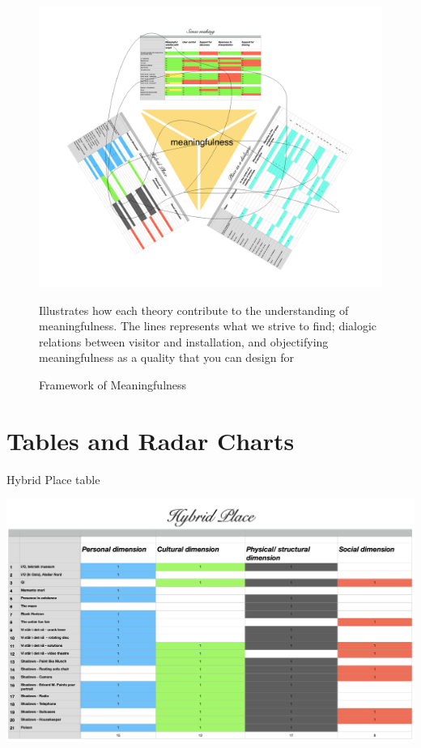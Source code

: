 \begin{figure}[H]
\includegraphics[width=14cm]{pictures/analysis/table_triangle.png}
\caption{Framework of Meaningfulness}{Illustrates how each theory contribute to the understanding of meaningfulness. The lines represents what we strive to find; dialogic relations between visitor and installation, and objectifying meaningfulness as a quality that you can design for}
\end{figure}

\section{Tables and Radar Charts}

\begin{table}[H]
  \caption{Hybrid Place table}
  \includegraphics[width=20cm, angle=90]{pictures/analysis/hybrid.png}
\end{table}

